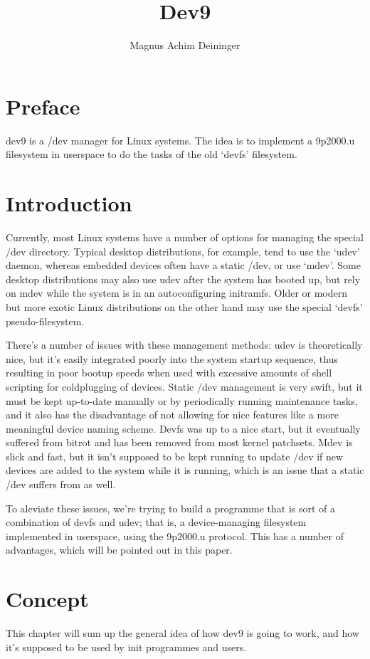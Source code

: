 \documentclass[a4paper,twoside,titlepage]{article}
\title{Dev9}
\author{Magnus Achim Deininger}
\begin{document}
\maketitle

\section*{Preface}
dev9 is a /dev manager for Linux systems. The idea is to implement a 9p2000.u
filesystem in userspace to do the tasks of the old `devfs' filesystem.

\section*{Introduction}
Currently, most Linux systems have a number of options for managing the special
/dev directory. Typical desktop distributions, for example, tend to use the
`udev' daemon, whereas embedded devices often have a static /dev, or use `mdev'.
Some desktop distributions may also use udev after the system has booted up, but
rely on mdev while the system is in an autoconfiguring initramfs. Older or
modern but more exotic Linux distributions on the other hand may use the special
`devfs' pseudo-filesystem.

There's a number of issues with these management methods: udev is theoretically
nice, but it's easily integrated poorly into the system startup sequence, thus
resulting in poor bootup speeds when used with excessive amounts of shell
scripting for coldplugging of devices. Static /dev management is very swift, but
it must be kept up-to-date manually or by periodically running maintenance
tasks, and it also has the disadvantage of not allowing for nice features like a
more meaningful device naming scheme. Devfs was up to a nice start, but it
eventually suffered from bitrot and has been removed from most kernel patchsets.
Mdev is slick and fast, but it isn't supposed to be kept running to update /dev
if new devices are added to the system while it is running, which is an issue
that a static /dev suffers from as well.

To aleviate these issues, we're trying to build a programme that is sort of a
combination of devfs and udev; that is, a device-managing filesystem implemented
in userspace, using the 9p2000.u protocol. This has a number of advantages,
which will be pointed out in this paper.

\section{Concept}
This chapter will sum up the general idea of how dev9 is going to work, and how
it's supposed to be used by init programmes and users.
\end{document}
